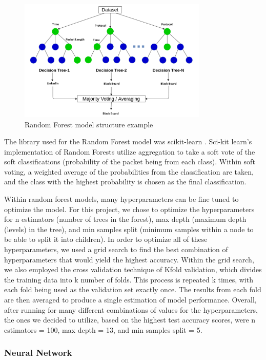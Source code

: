 \documentclass[10pt,sigconf,letterpaper,nonacm]{acmart}
\begin{document}
\begin{figure}[!h]
  \centering
  \includegraphics[width=9cm]{Figures_and_Graphs/RandomForestExample.png}
  \caption{Random Forest model structure example}
  \label{fig:RFExample}
\end{figure}

The library used for the Random Forest model was scikit-learn \cite{scikit-learn}. Sci-kit learn's implementation of Random Forests utilize aggregation to take a soft vote of the soft classifications (probability of the packet being from each class). Within soft voting, a weighted average of the probabilities from the classification are taken, and the class with the highest probability is chosen as the final classification.

Within random forest models, many hyperparameters can be fine tuned to optimize the model. For this project, we chose to optimize the hyperparameters for n estimators (number of trees in the forest), 
max depth (maximum depth (levels) in the tree), and min samples split (minimum samples within a node to be able to split it into children). In order to optimize all of these hyperparameters, we used a grid search to find the best combination of hyperparameters that would 
yield the highest accuracy. Within the grid search, we also employed the cross validation technique of Kfold validation, which divides the training data into k number of folds. This process is repeated k times, with each fold being used as the validation set exactly once. The results from each fold are then averaged to produce a single estimation of model performance. Overall, after running for many different combinations of values for the 
hyperparameters, the ones we decided to utilize, based on the highest test accuracy scores, were n estimators = 100, max depth = 13, and min samples split = 5. 

\subsubsection{Neural Network}
\end{document}
